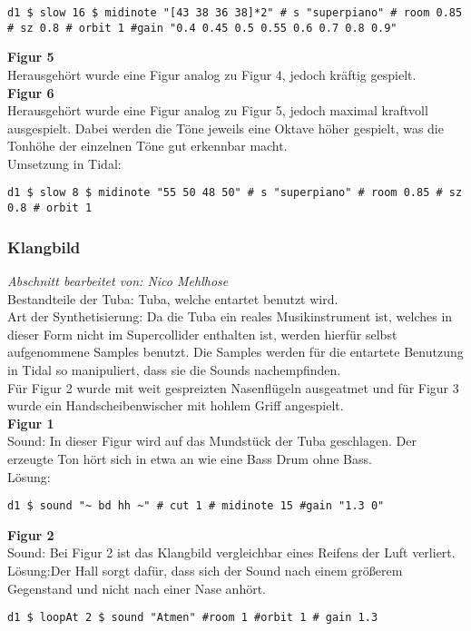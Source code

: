 \documentclass[
10pt, %
a4paper, %
oneside, %
headinclude,footinclude, %
BCOR5mm, %
]{scrartcl}
\begin{document}
\begin{lstlisting}
d1 $ slow 16 $ midinote "[43 38 36 38]*2" # s "superpiano" # room 0.85 # sz 0.8 # orbit 1 #gain "0.4 0.45 0.5 0.55 0.6 0.7 0.8 0.9"
\end{lstlisting}


\noindent\textbf{Figur 5}\\
Herausgehört wurde eine Figur analog zu Figur 4, jedoch kräftig gespielt.\\

\noindent\textbf{Figur 6}\\
Herausgehört wurde eine Figur analog zu Figur 5, jedoch maximal kraftvoll ausgespielt. Dabei werden die Töne jeweils eine Oktave höher gespielt, was die Tonhöhe der einzelnen Töne gut erkennbar macht.\\

\noindent Umsetzung in Tidal:
\begin{lstlisting}
d1 $ slow 8 $ midinote "55 50 48 50" # s "superpiano" # room 0.85 # sz 0.8 # orbit 1
\end{lstlisting}

\subsubsection{Klangbild}
\textit{Abschnitt bearbeitet von: Nico Mehlhose}\\

\noindent Bestandteile der Tuba: Tuba, welche entartet benutzt wird.\\
Art der Synthetisierung: Da die Tuba ein reales Musikinstrument ist, welches in dieser Form nicht im Supercollider enthalten ist,
werden hierfür selbst aufgenommene Samples benutzt. Die Samples werden für die entartete Benutzung in Tidal so manipuliert, dass sie die Sounds
nachempfinden.\\
Für Figur 2 wurde mit weit gespreizten Nasenflügeln ausgeatmet und für Figur 3 wurde ein Handscheibenwischer mit hohlem Griff angespielt.\\

\noindent\textbf{Figur 1}\\
 Sound: In dieser Figur wird auf das Mundstück der Tuba geschlagen. Der erzeugte Ton hört sich in etwa an wie eine Bass Drum ohne Bass.\\
Lösung:
\begin{lstlisting}
d1 $ sound "~ bd hh ~" # cut 1 # midinote 15 #gain "1.3 0"
\end{lstlisting}

\noindent\textbf{Figur 2}\\
Sound: Bei Figur 2 ist das Klangbild vergleichbar eines Reifens der Luft verliert.\\
Lösung:Der Hall sorgt dafür, dass sich der Sound nach einem größerem Gegenstand und nicht nach einer Nase anhört.
\begin{lstlisting}
d1 $ loopAt 2 $ sound "Atmen" #room 1 #orbit 1 # gain 1.3
\end{lstlisting}
\end{document}
